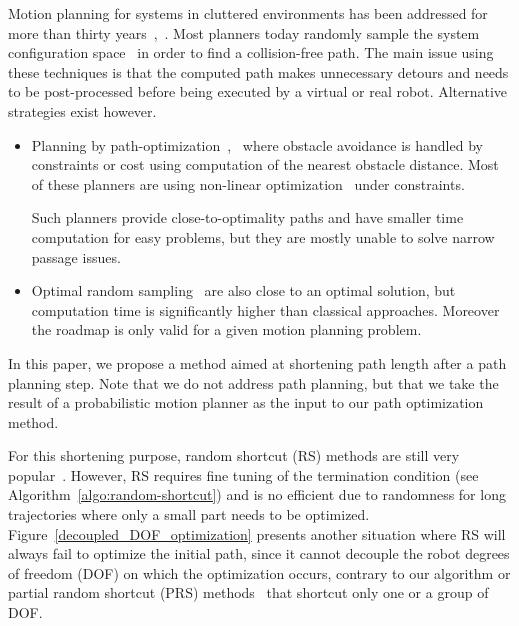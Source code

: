 \documentclass{tADR2e}
\begin{document}
Motion planning for systems in cluttered environments has been addressed for more
than thirty years~\citep{ref-motionplan},~\citep{ref-pianomover}. Most planners
today randomly sample the system configuration space~\cite{ref-spaceconfig} in
order to find a collision-free path. The main issue using these techniques is
 that the computed path makes unnecessary detours and needs to be post-processed 
 before being executed by a virtual or real robot. Alternative
strategies exist however.
\begin{itemize}
\item Planning by path-optimization~\cite{itomp2012},~\cite{voronoiOMP} where
obstacle avoidance is handled by constraints or cost using computation of the
nearest obstacle distance. Most of these planners are using non-linear
optimization~\cite{BettsNonlinopt} under constraints.
   
Such planners provide close-to-optimality paths and have smaller time computation
for easy problems, but they are mostly unable to solve narrow passage issues.
 
\item Optimal random sampling~\cite{KaramanPRMstarRRTstar} are also close to an
optimal solution, but computation time is significantly higher than classical
approaches. Moreover the roadmap is only valid for a given motion planning
   problem. 
\end{itemize}

In this paper, we propose a method aimed at shortening path length after a path
planning step. Note that we do not address path planning, but that we take the
result of a probabilistic motion planner as the input to our path optimization 
method.

For this shortening purpose, random shortcut (RS) methods are
still very 
popular~\cite{Sekhavat-Svestka1998,Geraerts04clearancebased,HauserFastSmooth}. 
However, RS requires fine 
tuning of the termination condition (see 
Algorithm~\ref{algo:random-shortcut}) and is no efficient due to randomness for long 
trajectories where only a small part needs to be optimized. 
Figure~\ref{decoupled_DOF_optimization} presents another situation where RS will 
always fail to optimize the initial path, since it cannot decouple the 
robot degrees of freedom (DOF) on which the optimization occurs, contrary to our 
algorithm or partial random shortcut (PRS) methods~\cite{Geraerts04clearancebased} 
that shortcut only one or a group of DOF.
\end{document}
